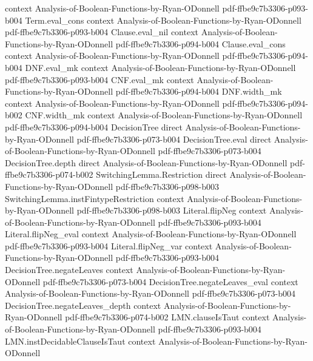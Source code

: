 \begin{lemma}
  {context}
  {Analysis-of-Boolean-Functions-by-Ryan-ODonnell}
  {pdf-ffbe9c7b3306-p093-b004}
\proofstep
  {Term.eval_cons}
  {context}
  {Analysis-of-Boolean-Functions-by-Ryan-ODonnell}
  {pdf-ffbe9c7b3306-p093-b004}
\proofstep
  {Clause.eval_nil}
  {context}
  {Analysis-of-Boolean-Functions-by-Ryan-ODonnell}
  {pdf-ffbe9c7b3306-p094-b004}
\proofstep
  {Clause.eval_cons}
  {context}
  {Analysis-of-Boolean-Functions-by-Ryan-ODonnell}
  {pdf-ffbe9c7b3306-p094-b004}
\proofstep
  {DNF.eval_mk}
  {context}
  {Analysis-of-Boolean-Functions-by-Ryan-ODonnell}
  {pdf-ffbe9c7b3306-p093-b004}
\proofstep
  {CNF.eval_mk}
  {context}
  {Analysis-of-Boolean-Functions-by-Ryan-ODonnell}
  {pdf-ffbe9c7b3306-p094-b004}
\proofstep
  {DNF.width_mk}
  {context}
  {Analysis-of-Boolean-Functions-by-Ryan-ODonnell}
  {pdf-ffbe9c7b3306-p094-b002}
\proofstep
  {CNF.width_mk}
  {context}
  {Analysis-of-Boolean-Functions-by-Ryan-ODonnell}
  {pdf-ffbe9c7b3306-p094-b004}
\proofstep
  {DecisionTree}
  {direct}
  {Analysis-of-Boolean-Functions-by-Ryan-ODonnell}
  {pdf-ffbe9c7b3306-p073-b004}
\proofstep
  {DecisionTree.eval}
  {direct}
  {Analysis-of-Boolean-Functions-by-Ryan-ODonnell}
  {pdf-ffbe9c7b3306-p073-b004}
\proofstep
  {DecisionTree.depth}
  {direct}
  {Analysis-of-Boolean-Functions-by-Ryan-ODonnell}
  {pdf-ffbe9c7b3306-p074-b002}
\proofstep
  {SwitchingLemma.Restriction}
  {direct}
  {Analysis-of-Boolean-Functions-by-Ryan-ODonnell}
  {pdf-ffbe9c7b3306-p098-b003}
\proofstep
  {SwitchingLemma.instFintypeRestriction}
  {context}
  {Analysis-of-Boolean-Functions-by-Ryan-ODonnell}
  {pdf-ffbe9c7b3306-p098-b003}
\proofstep
  {Literal.flipNeg}
  {context}
  {Analysis-of-Boolean-Functions-by-Ryan-ODonnell}
  {pdf-ffbe9c7b3306-p093-b004}
\proofstep
  {Literal.flipNeg_eval}
  {context}
  {Analysis-of-Boolean-Functions-by-Ryan-ODonnell}
  {pdf-ffbe9c7b3306-p093-b004}
\proofstep
  {Literal.flipNeg_var}
  {context}
  {Analysis-of-Boolean-Functions-by-Ryan-ODonnell}
  {pdf-ffbe9c7b3306-p093-b004}
\proofstep
  {DecisionTree.negateLeaves}
  {context}
  {Analysis-of-Boolean-Functions-by-Ryan-ODonnell}
  {pdf-ffbe9c7b3306-p073-b004}
\proofstep
  {DecisionTree.negateLeaves_eval}
  {context}
  {Analysis-of-Boolean-Functions-by-Ryan-ODonnell}
  {pdf-ffbe9c7b3306-p073-b004}
\proofstep
  {DecisionTree.negateLeaves_depth}
  {context}
  {Analysis-of-Boolean-Functions-by-Ryan-ODonnell}
  {pdf-ffbe9c7b3306-p074-b002}
\proofstep
  {LMN.clauseIsTaut}
  {context}
  {Analysis-of-Boolean-Functions-by-Ryan-ODonnell}
  {pdf-ffbe9c7b3306-p093-b004}
\proofstep
  {LMN.instDecidableClauseIsTaut}
  {context}
  {Analysis-of-Boolean-Functions-by-Ryan-ODonnell}

\end{lemma}
